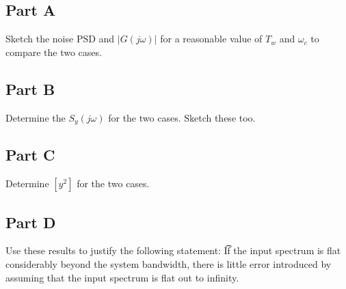 \documentclass{article}
\begin{document}
\subsection*{Part A}
Sketch the noise PSD and $|G(j\omega)|$ for a reasonable value of $T_w$ and $\omega_c$ to compare the two cases.
\subsection*{Part B}
Determine the $S_y(j\omega)$ for the two cases.  Sketch these too.
\subsection*{Part C}
Determine $\left[y^2\right]$ for the two cases.
\subsection*{Part D}
Use these results to justify the following statement:
\t If the input spectrum is flat considerably beyond the system bandwidth, there is little error introduced by assuming that the input spectrum is flat out to infinity.
\end{document}

